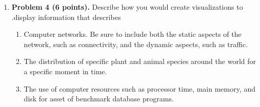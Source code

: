 \documentclass{article}%
\newenvironment{proof}[1][Proof]{\textbf{#1.} }{\ \rule{0.5em}{0.5em}}
\begin{document}
\begin{enumerate}
\begin{proof}
\begin{enumerate}
\item \textbf{Triangle Inequality.} \\
$ D(A,C) \leq D(A,B) + D(B,C) $ for all set $A,B,$ and $C$. \\
By De Morgan, $D(A,B) = size(A-B) + size(B-A) = size(A) + size(B) - 2size(A \bigcap B) $ \\
 $D(B,C) = size(B-C) + size(C-B) = size(B) + size(C) - 2size(B \bigcap C) $ \\
 $D(A,C) = size(A-C) + size(C-A) = size(A) + size(C) - 2size(A \bigcap C) $.\\
 $D(A,B) + D(B,C) - D(A,C)=size(A) + size(B) - 2size(A \bigcap B) + size(B) + size(C) - 2size(B \bigcap C)  - size(A) - size(C) + 2size(A \bigcap C)  $ \\
 $\Rightarrow D(A,B) + D(B,C) - D(A,C)= 2size(B) - 2size(A \bigcap B) - 2size(B \bigcap C) + 2size(A \bigcap C)  $ \\
 By De Morgan, $size(B) + size(A \bigcap B \bigcap C) \geq size(A \bigcap B) + size(B \bigcap C) $. \\
 Since $size(A \bigcap C)  \geq  size(A \bigcap B \bigcap C) $, $size(B) + size(A \bigcap C) \geq size(A \bigcap B) + size(B \bigcap C) $.\\
 $\Rightarrow 2size(B) - 2size(A \bigcap B) - 2size(B \bigcap C) + 2size(A \bigcap C)  \geq 0$ \\
 $\Rightarrow D(A,B) + D(B,C) - D(A,C) \geq 0 \Rightarrow D(A,C) \leq D(A,B) + D(B,C) $\\
 Thus, $ D(A,C) \leq D(A,B) + D(B,C) $ for all set $A,B,$ and $C$.
\end{enumerate}
 Since all these three properties hold for $D(A,B) := size(A-B) + size(B-A)$, $D(A,B)$ satisfies the metric axioms.
 
 \end{proof}
 


\item \textbf{Problem 4 (6 points).} Describe how you would create visualizations to .display information that describes
 \begin{enumerate}
		\item Computer networks. Be sure to include both the static aspects of the network, such as connectivity, and the dynamic aspects, such as traffic.
		\item The distribution of specific plant and animal species around the world for a specific moment in time.
		\item The use of computer resources such as processor time, main memory, and disk for asset of benchmark database programs.
 \end{enumerate}
 

\end{enumerate}
\end{document}
